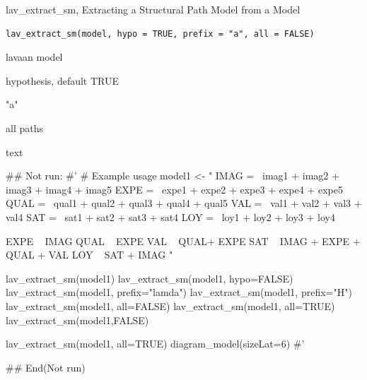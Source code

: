 \documentclass[a4paper]{book}
\begin{document}
%
\begin{Description}
lav\_extract\_sm, Extracting a Structural Path Model from a Model
\end{Description}
%
\begin{Usage}
\begin{verbatim}
lav_extract_sm(model, hypo = TRUE, prefix = "a", all = FALSE)
\end{verbatim}
\end{Usage}
%
\begin{Arguments}
\begin{ldescription}
\item[\code{model}] lavaan model

\item[\code{hypo}] hypothesis, default TRUE

\item[\code{prefix}] "a"

\item[\code{all}] all paths
\end{ldescription}
\end{Arguments}
%
\begin{Value}
text
\end{Value}
%
\begin{Examples}
\begin{ExampleCode}

\#\# Not run: 
#'
# Example usage
model1 <- "
IMAG =~ imag1 + imag2 + imag3 + imag4 + imag5
EXPE =~ expe1 + expe2 + expe3 + expe4 + expe5
QUAL =~ qual1 + qual2 + qual3 + qual4 + qual5
VAL =~ val1 + val2 + val3 + val4
SAT =~ sat1 + sat2 + sat3 + sat4
LOY =~ loy1 + loy2 + loy3 + loy4

EXPE ~ IMAG
QUAL ~ EXPE
VAL ~  QUAL+ EXPE
SAT ~ IMAG + EXPE + QUAL + VAL
LOY ~ SAT + IMAG
"


lav_extract_sm(model1)%
lav_extract_sm(model1, hypo=FALSE)%
lav_extract_sm(model1, prefix="lamda")%
lav_extract_sm(model1, prefix="H")%
lav_extract_sm(model1, all=FALSE) %
lav_extract_sm(model1, all=TRUE) %
lav_extract_sm(model1,FALSE) %


lav_extract_sm(model1, all=TRUE) %
  diagram_model(sizeLat=6)
#'


## End(Not run)


\end{ExampleCode}
\end{Examples}
\end{document}
